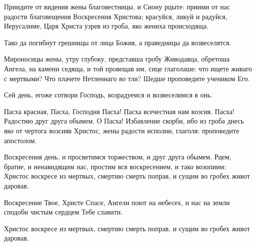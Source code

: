 \begin{mymulticols}
Приидите от видения жены благовестницы, и Сиону рцыте: приими от нас радости благовещения Воскресения Христова; красуйся, ликуй и радуйся, Иерусалиме, Царя Христа узрев из гроба, яко жениха происходяща. 

 Тако да погибнут грешницы от лица Божия, а праведницы да возвеселятся. 

Мироносицы жены, утру глубоку, представша гробу Живодавца, обретоша Ангела, на камени седяща, и той провещав им, сице глаголаше: что ищете живаго с мертвыми? Что плачете Нетленнаго во тли? Шедше проповедите учеником Его. 

 Сей день, егоже сотвори Господь, возрадуемся и возвеселимся в онь. 

Пасха красная, Пасха, Господня Пасха! Пасха всечестная нам возсия. Пасха! Радостию друг друга обымем. О Пасха! Избавление скорби, ибо из гроба днесь яко от чертога возсияв Христос, жены радости исполни, глаголя: проповедите апостолом.

\slavainyne

Воскресения день, и просветимся торжеством, и друг друга обымем. Рцем, братие, и ненавидящим нас, простим вся воскресением, и тако возопиим: Христос воскресе из мертвых, смертию смерть поправ, и сущим во гробех живот даровав. 

\end{mymulticols}

\mychapterending

\begin{mymulticols}


Воскресение Твое, Христе Спасе, Ангели поют на небесех, и нас на земли сподоби чистым сердцем Тебе славити.


Христос воскресе из мертвых, смертию смерть поправ, и сущим во гробех живот даровав.

\end{mymulticols}

\mychapterending


{\centering{}\par}

